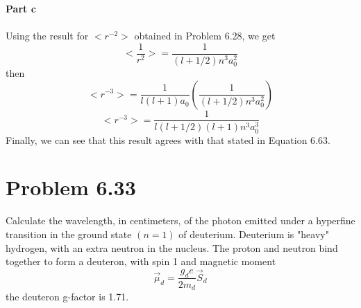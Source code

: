 \documentclass[12 pt]{article}
\numberwithin{equation}{section}
\begin{document}
\textbf{Part c}\\
\\
Using the result for $\big<r^{-2}\big>$ obtained in Problem 6.28, we get 
\[\bigg<\frac{1}{r^2}\bigg> = \frac{1}{(l+1/2)n^3a_0^2}\]
then
\[
  \big<r^{-3}\big> = \frac{1}{l(l+1)a_0}\left(\frac{1}{(l+1/2)n^3a_0^2} \right)
\]
\[
  \boxed{\big<r^{-3}\big> = \frac{1}{l(l+1/2)(l+1)n^3a_0^3}}
\]
Finally, we can see that this result agrees with that stated in Equation 6.63.
\section*{Problem 6.33}
Calculate the wavelength, in centimeters, of the photon emitted under a hyperfine 
transition in the ground state $(n=1)$ of deuterium. Deuterium is "heavy" hydrogen,
with an extra neutron in the nucleus. The proton and neutron bind together to form a 
deuteron, with spin 1 and magnetic moment
\[\vec{\mu}_d = \frac{g_d e}{2m_d}\vec{S}_d\]
the deuteron g-factor is 1.71.
\end{document}
